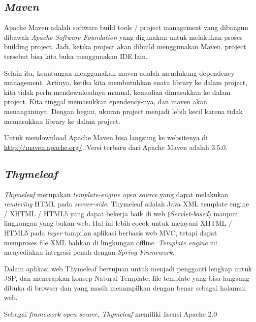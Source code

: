 \subsection{\textit{Maven} \cite{MengenalMaven2015EGunawan}}
Apache Maven adalah software build tools / project management yang dibangun dibawah \textit{Apache Software Foundation} yang digunakan untuk melakukan proses building project. Jadi, ketika project akan dibuild menggunakan Maven, project tersebut bisa kita buka menggunakan IDE lain.

Selain itu, keuntungan menggunakan maven adalah mendukung dependency management. Artinya, ketika kita membutuhkan suatu library ke dalam project, kita tidak perlu mendownloadnya manual, kemudian dimasukkan ke dalam project. Kita tinggal memasukkan  ependency-nya, dan maven akan menanganinya.  Dengan begini, ukuran project menjadi lebih kecil karena tidak memasukkan library ke dalam project.

Untuk mendownload Apache Maven bisa langsung ke websitenya di \url{http://maven.apache.org/}. Versi terbaru dari Apache Maven adalah 3.5.0.

\subsection{\textit{Thymeleaf} \cite{CogoluegnesIntroducing:2013}}
\textit{Thymeleaf} merupakan \textit{template-engine open source} yang dapat melakukan \textit{rendering} HTML pada \textit{server-side}. Thymeleaf adalah Java XML template engine / XHTML / HTML5 yang dapat bekerja baik di web (\textit{Servlet-based}) maupun lingkungan yang bukan web. Hal ini lebih cocok untuk melayani XHTML / HTML5 pada \textit{layer} tampilan aplikasi berbasis web MVC, tetapi dapat memproses file XML bahkan di lingkungan offline. \textit{Template engine} ini menyediakan integrasi penuh dengan \textit{Spring Framework}. 

Dalam aplikasi web Thymeleaf bertujuan untuk menjadi pengganti lengkap untuk JSP, dan menerapkan konsep Natural Template: file template yang bisa langsung dibuka di browser dan yang masih menampilkan dengan benar sebagai halaman web.

Sebagai \textit{framework open source}, \textit{Thymeleaf} memiliki lisensi Apache 2.0 



